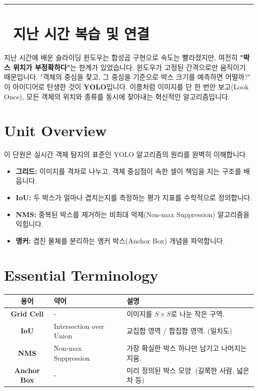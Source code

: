 \documentclass[11pt,a4paper]{book}
\theoremstyle{definition}
\begin{document}
\vspace{0.5cm}
\hrule
\vspace{0.5cm}

\section*{🔗 지난 시간 복습 및 연결}
지난 시간에 배운 슬라이딩 윈도우는 합성곱 구현으로 속도는 빨라졌지만, 여전히 \textbf{"박스 위치가 부정확하다"}는 한계가 있었습니다. 윈도우가 고정된 간격으로만 움직이기 때문입니다.
"객체의 중심을 찾고, 그 중심을 기준으로 박스 크기를 예측하면 어떨까?"
이 아이디어로 탄생한 것이 \textbf{YOLO}입니다. 이름처럼 이미지를 단 한 번만 보고(Look Once), 모든 객체의 위치와 종류를 동시에 찾아내는 혁신적인 알고리즘입니다.

\section{Unit Overview}
\begin{summarybox}[title={핵심 목표}]
이 단원은 실시간 객체 탐지의 표준인 YOLO 알고리즘의 원리를 완벽히 이해합니다.
\begin{itemize}
    \item \textbf{그리드:} 이미지를 격자로 나누고, 객체 중심점이 속한 셀이 책임을 지는 구조를 배웁니다.
    \item \textbf{IoU:} 두 박스가 얼마나 겹치는지를 측정하는 평가 지표를 수학적으로 정의합니다.
    \item \textbf{NMS:} 중복된 박스를 제거하는 비최대 억제(Non-max Suppression) 알고리즘을 익힙니다.
    \item \textbf{앵커:} 겹친 물체를 분리하는 앵커 박스(Anchor Box) 개념을 파악합니다.
\end{itemize}
\end{summarybox}

\section{Essential Terminology}
\begin{center}
\begin{tabular}{|c|l|l|}
\hline
\textbf{용어} & \textbf{약어} & \textbf{설명} \\ \hline
\textbf{Grid Cell} & - & 이미지를 $S \times S$로 나눈 작은 구역. \\ \hline
\textbf{IoU} & Intersection over Union & 교집합 영역 / 합집합 영역. (일치도) \\ \hline
\textbf{NMS} & Non-max Suppression & 가장 확실한 박스 하나만 남기고 나머지는 지움. \\ \hline
\textbf{Anchor Box} & - & 미리 정의된 박스 모양. (길쭉한 사람, 넓은 차 등) \\ \hline
\end{tabular}
\end{center}
\end{document}
